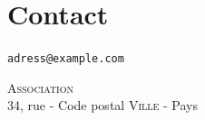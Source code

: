 \documentclass[12pt,nofoldmark,notumble]{leaflet}
\begin{document}
\vspace*{\fill}

\section{\faEnvelope Contact}

\texttt{adress@example.com}
\vspace*{\fill}
\begin{center}
{ \textsc{Association} \\ 34,
  rue - Code postal \textsc{Ville} - Pays}

\end{center}
\end{document}
